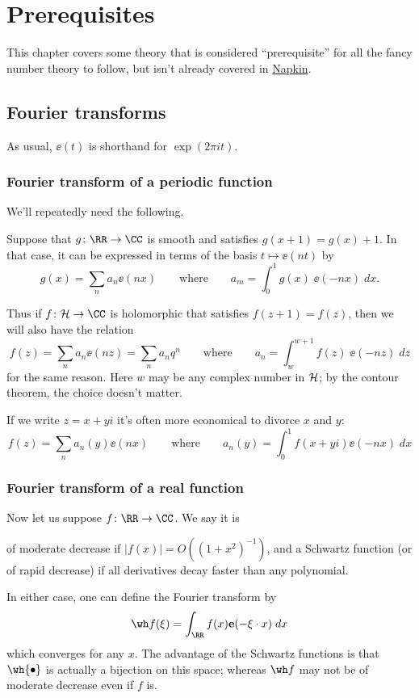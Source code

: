\chapter{Prerequisites}
This chapter covers some theory that is considered ``prerequisite''
for all the fancy number theory to follow, but isn't already covered
in \href{https://web.evanchen.cc/napkin.html}{Napkin}.

\section{Fourier transforms}
As usual, $\ee(t)$ is shorthand for $\exp(2\pi i t)$.

\subsection{Fourier transform of a periodic function}
We'll repeatedly need the following.
\begin{theorem}
Suppose that $g \colon \RR \to \CC$
is smooth and satisfies $g(x+1) = g(x) + 1$.
In that case, it can be expressed
in terms of the basis $t \mapsto \ee(nt)$ by
\[
  g(x) = \sum_n a_n \ee(nx)
  \qquad\text{where}\qquad
  a_m = \int_0^1 g(x) \; \ee(-nx) \; dx.
\]
\end{theorem}

Thus if $f \colon \HH \to \CC$ is holomorphic
that satisfies $f(z+1) = f(z)$,
then we will also have the relation
\[ f(z) = \sum_n a_n \ee(nz) = \sum_n a_n q^n
  \qquad\text{where}\qquad
  a_n = \int_w^{w+1} f(z) \; \ee(-nz) \; dz \]
for the same reason.
Here $w$ may be any complex number in $\mathcal H$;
by the contour theorem, the choice doesn't matter.

If we write $z = x+yi$ it's often
more economical to divorce $x$ and $y$:
\[ f(z) = \sum_n a_n(y) \ee(nx)
  \qquad\text{where}\qquad
  a_n(y) = \int_0^1 f(x+yi) \ee(-nx) \; dx \]

\subsection{Fourier transform of a real function}
Now let us suppose $f \colon \RR \to \CC$.
We say it is
\begin{itemize}
  \ii of \alert{moderate decrease}
  if $|f(x)| = O( (1+x^2)^{-1} )$, and
  \ii a \alert{Schwartz function} (or of rapid decrease)
  if all derivatives decay faster than any polynomial.
\end{itemize}
In either case,
one can define the Fourier transform by
\[ \wh f(\xi)
  = \int_\RR f(x) \ee(-\xi \cdot x) \; dx \]
which converges for any $x$.
The advantage of the Schwartz functions is that
$\wh{\bullet}$ is actually a bijection on this space;
whereas $\wh f$ may not be of moderate decrease
even if $f$ is.

